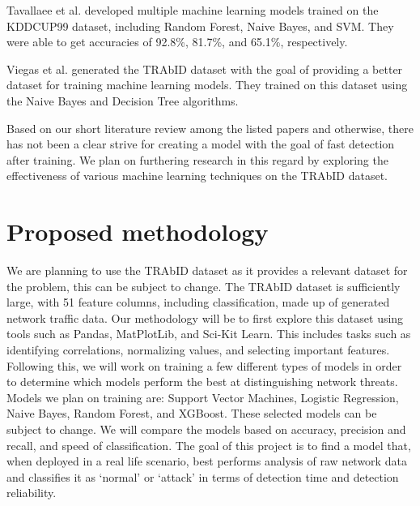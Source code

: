 Tavallaee et al. developed multiple machine learning models trained on the KDDCUP99 dataset, including Random Forest, Naive Bayes, and SVM. They were able to get accuracies of 92.8\%, 81.7\%, and 65.1\%, respectively. \cite{tavallaee2009detailed}

Viegas et al. generated the TRAbID dataset with the goal of providing a better dataset for training machine learning models. They trained on this dataset using the Naive Bayes and Decision Tree algorithms. \cite{viegas2017toward}

Based on our short literature review among the listed papers and otherwise, there has not been a clear strive for creating a model with the goal of fast detection after training. We plan on furthering research in this regard by exploring the effectiveness of various machine learning techniques on the TRAbID dataset.

\section{Proposed methodology}
We are planning to use the TRAbID dataset \cite{viegas2017toward} as it provides a relevant dataset for the problem, this can be subject to change. The TRAbID dataset is sufficiently large, with 51 feature columns, including classification, made up of generated network traffic data. Our methodology will be to first explore this dataset using tools such as Pandas, MatPlotLib, and Sci-Kit Learn. This includes tasks such as identifying correlations, normalizing values, and selecting important features. Following this, we will work on training a few different types of models in order to determine which models perform the best at distinguishing network threats. Models we plan on training are: Support Vector Machines, Logistic Regression, Naive Bayes, Random Forest, and XGBoost. These selected models can be subject to change. We will compare the models based on accuracy, precision and recall, and speed of classification. The goal of this project is to find a model that, when deployed in a real life scenario, best performs analysis of raw network data and classifies it as `normal' or `attack' in terms of detection time and detection reliability.


